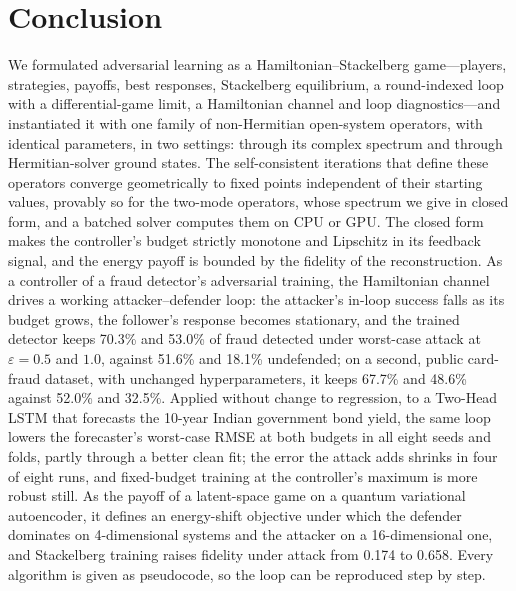\documentclass[conference]{IEEEtran}
\begin{document}
\section{Conclusion}
We formulated adversarial learning as a Hamiltonian--Stackelberg game---players, strategies, payoffs, best responses, Stackelberg equilibrium, a round-indexed loop with a differential-game limit, a Hamiltonian channel and loop diagnostics---and instantiated it with one family of non-Hermitian open-system operators, with identical parameters, in two settings: through its complex spectrum and through Hermitian-solver ground states. The self-consistent iterations that define these operators converge geometrically to fixed points independent of their starting values, provably so for the two-mode operators, whose spectrum we give in closed form, and a batched solver computes them on CPU or GPU. The closed form makes the controller's budget strictly monotone and Lipschitz in its feedback signal, and the energy payoff is bounded by the fidelity of the reconstruction. As a controller of a fraud detector's adversarial training, the Hamiltonian channel drives a working attacker--defender loop: the attacker's in-loop success falls as its budget grows, the follower's response becomes stationary, and the trained detector keeps 70.3\% and 53.0\% of fraud detected under worst-case attack at $\varepsilon{=}0.5$ and $1.0$, against 51.6\% and 18.1\% undefended; on a second, public card-fraud dataset, with unchanged hyperparameters, it keeps 67.7\% and 48.6\% against 52.0\% and 32.5\%. Applied without change to regression, to a Two-Head LSTM that forecasts the 10-year Indian government bond yield, the same loop lowers the forecaster's worst-case RMSE at both budgets in all eight seeds and folds, partly through a better clean fit; the error the attack adds shrinks in four of eight runs, and fixed-budget training at the controller's maximum is more robust still. As the payoff of a latent-space game on a quantum variational autoencoder, it defines an energy-shift objective under which the defender dominates on 4-dimensional systems and the attacker on a 16-dimensional one, and Stackelberg training raises fidelity under attack from 0.174 to 0.658. Every algorithm is given as pseudocode, so the loop can be reproduced step by step.

\appendices
\end{document}
